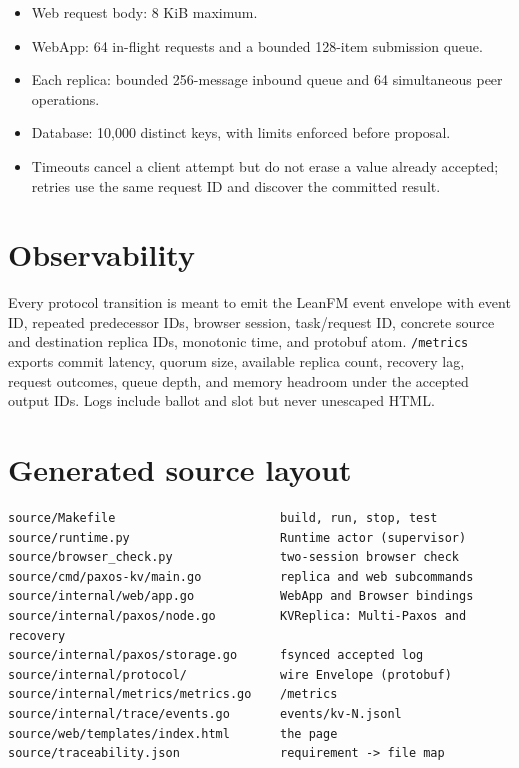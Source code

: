 \begin{itemize}
\tightlist
\item
  Web request body: 8 KiB maximum.
\item
  WebApp: 64 in-flight requests and a bounded 128-item submission queue.
\item
  Each replica: bounded 256-message inbound queue and 64 simultaneous
  peer operations.
\item
  Database: 10,000 distinct keys, with limits enforced before proposal.
\item
  Timeouts cancel a client attempt but do not erase a value already
  accepted; retries use the same request ID and discover the committed
  result.
\end{itemize}

\hypertarget{observability}{%
\section{Observability}\label{observability}}

Every protocol transition is meant to emit the LeanFM event envelope with
event ID, repeated predecessor IDs, browser session, task/request ID,
concrete source and destination replica IDs, monotonic time, and
protobuf atom. \texttt{/metrics} exports commit latency, quorum size,
available replica count, recovery lag, request outcomes, queue depth,
and memory headroom under the accepted output IDs. Logs include ballot
and slot but never unescaped HTML.

\hypertarget{generated-source-layout}{%
\section{Generated source layout}\label{generated-source-layout}}

\begin{verbatim}
source/Makefile                       build, run, stop, test
source/runtime.py                     Runtime actor (supervisor)
source/browser_check.py               two-session browser check
source/cmd/paxos-kv/main.go           replica and web subcommands
source/internal/web/app.go            WebApp and Browser bindings
source/internal/paxos/node.go         KVReplica: Multi-Paxos and recovery
source/internal/paxos/storage.go      fsynced accepted log
source/internal/protocol/             wire Envelope (protobuf)
source/internal/metrics/metrics.go    /metrics
source/internal/trace/events.go       events/kv-N.jsonl
source/web/templates/index.html       the page
source/traceability.json              requirement -> file map
\end{verbatim}

